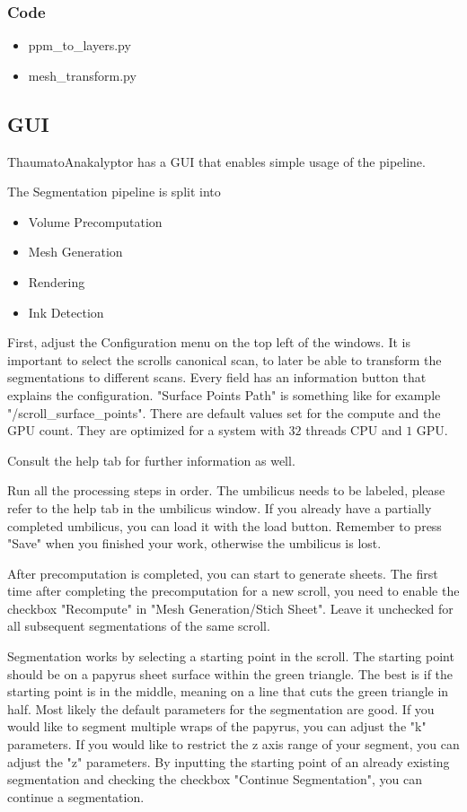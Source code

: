 \documentclass[peerreview]{IEEEtran}
\begin{document}
\subsubsection{Code}
\begin{itemize}
    \item ppm\_to\_layers.py
    \item mesh\_transform.py
\end{itemize}

\subsection{GUI}
ThaumatoAnakalyptor has a GUI that enables simple usage of the pipeline\cite{thaumato}.

The Segmentation pipeline is split into
\begin{itemize}
    \item Volume Precomputation
    \item Mesh Generation
    \item Rendering
    \item Ink Detection
\end{itemize}

First, adjust the Configuration menu on the top left of the windows. It is important to select the scrolls canonical scan, to later be able to transform the segmentations to different scans. Every field has an information button that explains the configuration. "Surface Points Path" is something like for example "/scroll\_surface\_points". There are default values set for the compute and the GPU count. They are optimized for a system with $32$ threads CPU and $1$ GPU.

Consult the help tab for further information as well.

Run all the processing steps in order. The umbilicus needs to be labeled, please refer to the help tab in the umbilicus window. If you already have a partially completed umbilicus, you can load it with the load button. Remember to press "Save" when you finished your work, otherwise the umbilicus is lost.

After precomputation is completed, you can start to generate sheets. The first time after completing the precomputation for a new scroll, you need to enable the checkbox "Recompute" in "Mesh Generation/Stich Sheet". Leave it unchecked for all subsequent segmentations of the same scroll.

Segmentation works by selecting a starting point in the scroll. The starting point should be on a papyrus sheet surface within the green triangle. The best is if the starting point is in the middle, meaning on a line that cuts the green triangle in half. Most likely the default parameters for the segmentation are good. If you would like to segment multiple wraps of the papyrus, you can adjust the "k" parameters. If you would like to restrict the z axis range of your segment, you can adjust the "z" parameters. By inputting the starting point of an already existing segmentation and checking the checkbox "Continue Segmentation", you can continue a segmentation. 
\end{document}
